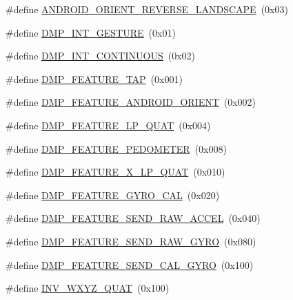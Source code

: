 \begin{DoxyCompactItemize}
\item 
\#define \hyperlink{group___d_r_i_v_e_r_s_ga98dc7e42de72097f62612c758de3ba16}{A\+N\+D\+R\+O\+I\+D\+\_\+\+O\+R\+I\+E\+N\+T\+\_\+\+R\+E\+V\+E\+R\+S\+E\+\_\+\+L\+A\+N\+D\+S\+C\+A\+PE}~(0x03)
\item 
\#define \hyperlink{group___d_r_i_v_e_r_s_gaab5d80253aaee2470c95c6981b731255}{D\+M\+P\+\_\+\+I\+N\+T\+\_\+\+G\+E\+S\+T\+U\+RE}~(0x01)
\item 
\#define \hyperlink{group___d_r_i_v_e_r_s_gaabccda0e9ccd1a2f4287d23fe4b0c776}{D\+M\+P\+\_\+\+I\+N\+T\+\_\+\+C\+O\+N\+T\+I\+N\+U\+O\+US}~(0x02)
\item 
\#define \hyperlink{group___d_r_i_v_e_r_s_ga87fac39cf95e2c56afdf507a986fa00b}{D\+M\+P\+\_\+\+F\+E\+A\+T\+U\+R\+E\+\_\+\+T\+AP}~(0x001)
\item 
\#define \hyperlink{group___d_r_i_v_e_r_s_gaf2b250fc928390d562f7bd80300ce419}{D\+M\+P\+\_\+\+F\+E\+A\+T\+U\+R\+E\+\_\+\+A\+N\+D\+R\+O\+I\+D\+\_\+\+O\+R\+I\+E\+NT}~(0x002)
\item 
\#define \hyperlink{group___d_r_i_v_e_r_s_gabf442c0477f8f7704a8094519ddfe38e}{D\+M\+P\+\_\+\+F\+E\+A\+T\+U\+R\+E\+\_\+\+L\+P\+\_\+\+Q\+U\+AT}~(0x004)
\item 
\#define \hyperlink{group___d_r_i_v_e_r_s_gabcf6a5bc9703782d711d0c6ba92ade85}{D\+M\+P\+\_\+\+F\+E\+A\+T\+U\+R\+E\+\_\+\+P\+E\+D\+O\+M\+E\+T\+ER}~(0x008)
\item 
\#define \hyperlink{group___d_r_i_v_e_r_s_gae879a3c9729f9e1be5e6d7c9211c69c0}{D\+M\+P\+\_\+\+F\+E\+A\+T\+U\+R\+E\+\_\+X\+\_\+\+L\+P\+\_\+\+Q\+U\+AT}~(0x010)
\item 
\#define \hyperlink{group___d_r_i_v_e_r_s_gaaf0ac890c1f83106c08b722f1e865fdb}{D\+M\+P\+\_\+\+F\+E\+A\+T\+U\+R\+E\+\_\+\+G\+Y\+R\+O\+\_\+\+C\+AL}~(0x020)
\item 
\#define \hyperlink{group___d_r_i_v_e_r_s_ga9eeb257febe4a305df7ad4cf31dc2755}{D\+M\+P\+\_\+\+F\+E\+A\+T\+U\+R\+E\+\_\+\+S\+E\+N\+D\+\_\+\+R\+A\+W\+\_\+\+A\+C\+C\+EL}~(0x040)
\item 
\#define \hyperlink{group___d_r_i_v_e_r_s_gaa59d3ed6f0cbc66e99ce637546434b34}{D\+M\+P\+\_\+\+F\+E\+A\+T\+U\+R\+E\+\_\+\+S\+E\+N\+D\+\_\+\+R\+A\+W\+\_\+\+G\+Y\+RO}~(0x080)
\item 
\#define \hyperlink{group___d_r_i_v_e_r_s_ga40462c6fd55b04b2f79723dd737ee795}{D\+M\+P\+\_\+\+F\+E\+A\+T\+U\+R\+E\+\_\+\+S\+E\+N\+D\+\_\+\+C\+A\+L\+\_\+\+G\+Y\+RO}~(0x100)
\item 
\#define \hyperlink{group___d_r_i_v_e_r_s_ga3d79cffe845a796a27d03432a1f2ade0}{I\+N\+V\+\_\+\+W\+X\+Y\+Z\+\_\+\+Q\+U\+AT}~(0x100)
\end{DoxyCompactItemize}
